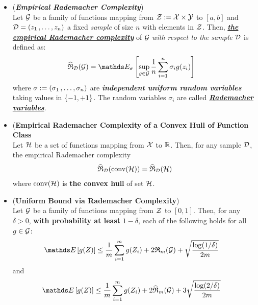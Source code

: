 \documentclass[11pt]{article}
\begin{document}
\begin{itemize}
\item \begin{definition} (\emph{\textbf{Empirical Rademacher Complexity}})\\
Let ${\mathcal G}$ be a family of functions mapping from ${\mathcal Z} := {\mathcal X} \times {\mathcal Y}$ to $[a, b]$ and ${\mathcal D} = (z_1 \,{,}\ldots{,}\, z_n)$ a fixed \emph{sample} of size $n$ with elements in ${\mathcal Z}$. Then, \underline{\emph{\textbf{the empirical Rademacher complexity}}} of ${\mathcal G}$ \emph{with respect to the sample ${\mathcal D}$} is defined as:
\begin{align}
\widehat{\mathfrak{R}}_{\cD}(\cG)&= \E{\sigma}{\sup_{g \in \cG}\frac{1}{n}\sum_{i=1}^{n}\sigma_{i}g(z_i)}   \label{eqn: rademacher_complexity}
\end{align}
where $\sigma := (\sigma_1 \,{,}\ldots{,}\, \sigma_n)$ are  \textbf{\emph{independent uniform random variables}} taking values in $\left\{-1, +1\right\}$. The random variables $\sigma_i$ are called \underline{\emph{\textbf{Rademacher variables}}}.
\end{definition}




\item \begin{proposition}(\textbf{Empirical Rademacher Complexity of a Convex Hull of Function Class}\\
Let ${\mathcal H}$ be a set of functions mapping from ${\mathcal X}$ to ${\mathbb R}$. Then, for any sample ${\mathcal D}$, the empirical Rademacher complexity 
\begin{align}
\widehat{{\mathfrak R}}_{{\mathcal D}}(\text{conv}({\mathcal H}))  = \widehat{{\mathfrak R}}_{{\mathcal D}}({\mathcal H}) \label{eqn: rademacher_complexity_convex_hull}
\end{align} where $\text{conv}({\mathcal H})$ is \textbf{the convex hull} of set ${\mathcal H}$.
\end{proposition}

\item \begin{theorem} (\textbf{Uniform Bound via Rademacher Complexity}) \citep{mohri2018foundations}\\
Let ${\mathcal G}$ be a family of functions mapping from ${\mathcal Z}$ to $[0, 1]$. Then, for any $\delta > 0$, \textbf{with probability at least} $1 - \delta$, each of the following holds for all $g \in {\mathcal G}$:
\begin{align}
\E{}{g(Z)} &\le \frac{1}{m}\sum_{i=1}^{m}g(Z_i) + 2 \frR_{m}(\cG)  + \sqrt{\frac{\log(1 / \delta)}{2m}} \label{ineqn: Rademacher_bound_1}
\end{align}
and
\begin{align}
\E{}{g(Z)} &\le \frac{1}{m}\sum_{i=1}^{m}g(Z_i) + 2 \widehat{\mathfrak{R}}_{m}(\cG) + 3\sqrt{\frac{\log(2 / \delta)}{2m}} \label{ineqn: Rademacher_bound_2}
\end{align}
\end{theorem}



\end{itemize}
\end{document}
